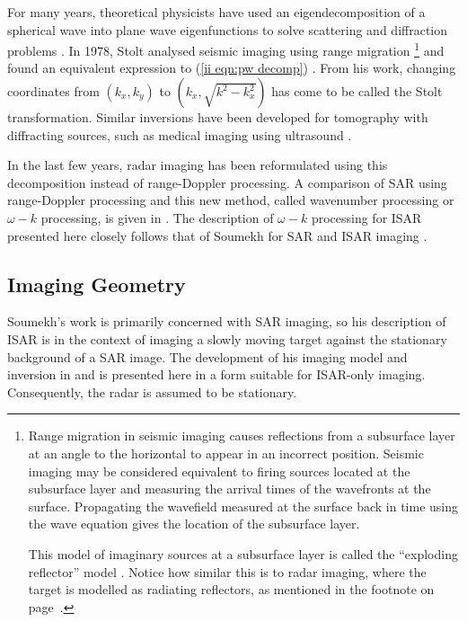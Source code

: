 For many years, theoretical physicists have used an eigendecomposition of a
spherical wave into plane wave eigenfunctions to solve scattering
and diffraction problems \cite[sec. 9.3]{Mor53b}.  In 1978, Stolt analysed
seismic imaging using range migration%
\footnote{\label{ii ftn:er}Range migration in seismic imaging causes
reflections from a subsurface layer at an angle to the horizontal to appear
in an incorrect position.  Seismic imaging may be considered equivalent to
firing sources located at the subsurface layer and measuring the arrival
times of the wavefronts at the surface.  Propagating the wavefield measured
at the surface back in time using the wave equation gives the location of
the subsurface layer.

This model of imaginary sources at a subsurface layer is called the 
``exploding reflector'' model \cite[ch. 2]{Hay85b}.  Notice how similar this
is to radar imaging, where the target is modelled as radiating reflectors,
as mentioned in the footnote on page~\protect\pageref{ii ftn:rr}.}%
and found an equivalent expression to (\ref{ii eqn:pw decomp}) \cite{Sto78}.
From his work, changing coordinates from $(k_x,k_y)$ to 
$(k_x,\sqrt{k^2-k_x^2})$ has come to be called the Stolt transformation. 
Similar inversions have been developed for tomography with diffracting
sources, such as medical imaging using ultrasound \cite[ch. 6]{Hay85b}.  

In the last few years, radar imaging has been reformulated using this 
decomposition \cite{Caf91} instead of range-Doppler processing.  A
comparison of SAR using range-Doppler processing and this new method, called
wavenumber processing or $\omega-k$ processing, is given in \cite{Bam92}.
The description of $\omega-k$ processing for ISAR presented here closely
follows that of Soumekh for SAR and ISAR imaging \cite{Sou94}.


\subsection{Imaging Geometry}


Soumekh's work is primarily concerned with SAR imaging, so his description
of ISAR is in the context of imaging a slowly moving target against the
stationary background of a SAR image.  The development of his imaging model
and inversion in \cite{Yan93} and \cite{Sou94} is presented here in a form
suitable for ISAR-only imaging.  Consequently, the radar is assumed to be
stationary.


